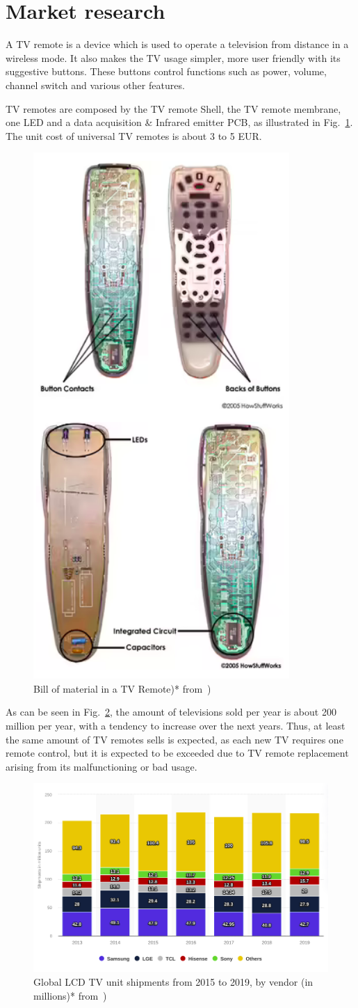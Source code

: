 \section{Market research}
\label{sec:market-research}
	A TV remote is a device which is used to operate a television from
        distance in a wireless mode. It also makes the TV usage simpler, more user friendly with its suggestive buttons. These buttons control functions such as power, volume, channel switch and various other features.

TV remotes are composed by the TV remote Shell,
the TV remote membrane, one LED and a data acquisition \& Infrared emitter PCB,
as illustrated in Fig.~\ref{fig:remotemat}. The unit cost of universal TV remotes is about 3 to 5 EUR.

\begin{figure}
\centering
    \includegraphics[width=0.3\columnwidth]{./img/remotematerial.png}
  \caption{Bill of material in a TV Remote)* from~\cite{remotematerial})}%
\label{fig:remotemat}
\end{figure}

As can be seen in Fig.~\ref{fig:tvsells}, the amount of televisions sold per
year is about 200 million per year, with a tendency to increase over the next
years. Thus, at least the same amount of TV remotes sells is expected, as each
new TV requires one remote control, but it is expected to be exceeded due to TV
remote replacement arising from its malfunctioning or bad usage.

\begin{figure}
\centering
    \includegraphics[width=0.7\columnwidth]{./img/tvsellings.png}
  \caption{Global LCD TV unit shipments from 2015 to 2019, by vendor (in millions)* from~\cite{tvsellings})}%
\label{fig:tvsells}
\end{figure}
%
